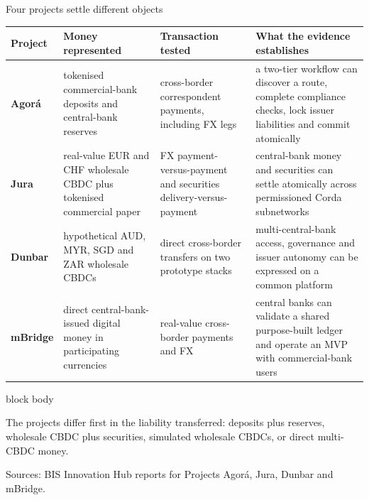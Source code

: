 \documentclass[aspectratio=169,12pt]{beamer}
\newcommand{\rust}[1]{\textcolor{Rust}{\textbf{#1}}}
\newcommand{\source}[1]{\vfill\par\fontsize{5.4}{6.5}\selectfont\color{Quiet}Sources: #1}
\newenvironment{statement}{%
  \begin{beamercolorbox}[sep=.18cm,rounded=false,wd=\linewidth]{block body}%
  \fontsize{13}{15.5}\selectfont\bfseries
}{\end{beamercolorbox}}
\begin{document}
\begin{frame}[shrink=20]{Four projects settle different objects}
  \fontsize{8.4}{10.1}\selectfont
  \begin{tabularx}{\textwidth}{L{1.40cm}L{2.55cm}L{2.45cm}Y}
    \toprule
    \textbf{Project} & \textbf{Money represented} & \textbf{Transaction tested} & \textbf{What the evidence establishes} \\
    \midrule
    \rust{Agor\'a} & tokenised commercial-bank deposits and central-bank reserves & cross-border correspondent payments, including FX legs & a two-tier workflow can discover a route, complete compliance checks, lock issuer liabilities and commit atomically \\
    \rust{Jura} & real-value EUR and CHF wholesale CBDC plus tokenised commercial paper & FX payment-versus-payment and securities delivery-versus-payment & central-bank money and securities can settle atomically across permissioned Corda subnetworks \\
    \rust{Dunbar} & hypothetical AUD, MYR, SGD and ZAR wholesale CBDCs & direct cross-border transfers on two prototype stacks & multi-central-bank access, governance and issuer autonomy can be expressed on a common platform \\
    \rust{mBridge} & direct central-bank-issued digital money in participating currencies & real-value cross-border payments and FX & central banks can validate a shared purpose-built ledger and operate an MVP with commercial-bank users \\
    \bottomrule
  \end{tabularx}
  \begin{statement}
    The projects differ first in the liability transferred: deposits plus reserves, wholesale CBDC plus securities, simulated wholesale CBDCs, or direct multi-CBDC money.
  \end{statement}
  \source{BIS Innovation Hub reports for Projects Agor\'a, Jura, Dunbar and mBridge.}
\end{frame}
\end{document}
